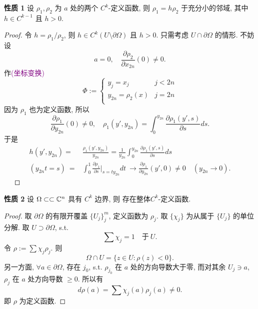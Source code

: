 \noindent\textbf{性质 1}
设 $\rho _1,\rho _2$ 为 $a$ 处的两个 $C^k$-定义函数, 则 $\rho _1=h \rho _2$ 于充分小的邻域, 其中 $h \in C^{k-1}$ 且 $h>0$. 
\begin{proof}
    令 $h=\rho _1/ \rho _2$, 则 $h \in C^k (U \setminus \partial \Omega )$ 且 $h>0$. 
    只需考虑 $U \cap \partial \Omega $ 的情形.
    不妨设 
    $$a=0, \quad \frac{\partial \rho _2}{\partial x_{2n}}(0) \neq 0.$$    
    作\textcolor{purple}{(坐标变换)} 
    $$ \Phi := \begin{cases}
        y_j=x_j &\text{} j<2n\\
        y_{2n}=\rho _2(x) &\text{} j=2n\\
    \end{cases}  $$ 
    因为 $\rho _1$ 也为定义函数, 所以 
    $$ \frac{\partial \rho _1}{\partial y_{2n}}(0) \neq 0, \quad \rho_1 (y',y_{2n}) = \int_{0}^{y_{2n}} \frac{\partial \rho _1(y',s)}{\partial s}ds.$$
    于是
    $$ \begin{aligned}
         h(y',y_{2n})=& \frac{\rho _1 (y',y_{2n})}{y_{2n}} = \frac{1}{y_{2n}}\int_{0}^{y_{2n}} \frac{\partial \rho _1(y',s)}{\partial s}ds \\
       (y_{2n}t=s)~=& \int_{0}^{1} \frac{\partial \rho _1}{\partial s} \bigg|_{s=t y_{2n}}dt ~ \to  \frac{\partial \rho _1}{\partial y_{2n}}(y',0) \neq 0 \quad (y_{2n}\to 0)
       .
    \end{aligned}  $$
    ~~
\end{proof}

\noindent\textbf{性质 2} 
设 $\Omega \subset \subset  {\mathbb C}^n$ 具有 $C^k$ 边界, 则 存在整体$C^k$-定义函数.  
\begin{proof}
    取 $\partial \Omega $ 的有限开覆盖 $\{U_j\}_{j}^{m}$, 定义函数为 $\rho _j$. 取 $\{\chi _j\}$ 为从属于 $\{U_j\}$ 的单位分解. 取 $U \supset \partial \Omega $, s.t. 
    $$ \sum \chi _j =1 \quad \text{于}~ U.$$   
    令 $\rho :=\sum \chi _j \rho _j$. 
    则 
    $$ \Omega \cap U=\{z \in U: \rho (z)<0\} .$$
    另一方面, $\forall a \in \partial \Omega $, 存在 $j_0$, s.t. $\rho _{j_0}$ 在 $a$ 处的方向导数大于零, 而对其余 $U_j \ni a$, $\rho _j$ 在 $a$ 处方向导数 $\geq 0$.
    所以有 
    $$ d \rho (a)=\sum \chi _j (a) \rho _j (a) \neq 0. $$
    即 $\rho $ 为定义函数.            
\end{proof}

